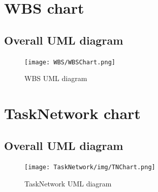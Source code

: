 \documentclass[a4paper, 12pt]{report}
\begin{document}





\chapter{WBS chart}
\section*{Overall UML diagram}
\begin{figure}[h!] \centering
\texttt{[image: WBS/WBSChart.png]}
\caption{WBS UML diagram}
\label{fig:WBSdiagram}
\end{figure}




\chapter{TaskNetwork chart}
\section*{Overall UML diagram}
\begin{figure}[h!] \centering
\texttt{[image: TaskNetwork/img/TNChart.png]}
\caption{TaskNetwork UML diagram}
\label{fig:TNdiagram}
\end{figure}



\end{document}
